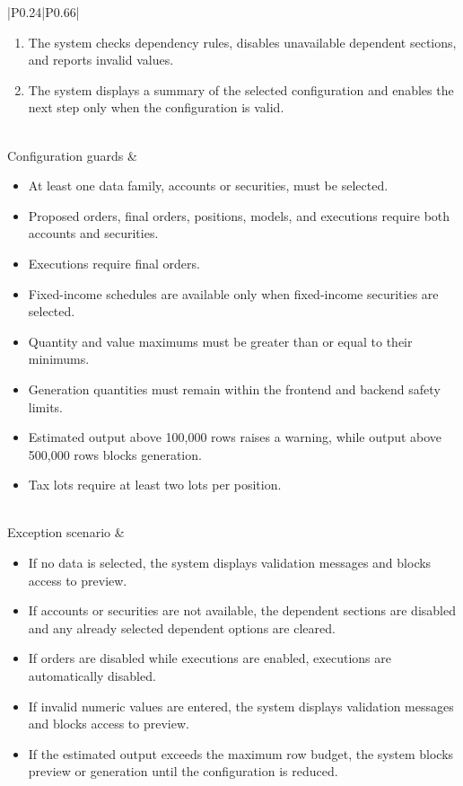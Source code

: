 \begin{longtable}{|P{0.24\linewidth}|P{0.66\linewidth}|}
\begin{enumerate}[leftmargin=*,nosep]
    \item The system checks dependency rules, disables unavailable dependent sections, and reports invalid values.
    \item The system displays a summary of the selected configuration and enables the next step only when the configuration is valid.
\end{enumerate} \\
\hline
Configuration guards &
\begin{itemize}[leftmargin=*,nosep]
    \item At least one data family, accounts or securities, must be selected.
    \item Proposed orders, final orders, positions, models, and executions require both accounts and securities.
    \item Executions require final orders.
    \item Fixed-income schedules are available only when fixed-income securities are selected.
    \item Quantity and value maximums must be greater than or equal to their minimums.
    \item Generation quantities must remain within the frontend and backend safety limits.
    \item Estimated output above 100,000 rows raises a warning, while output above 500,000 rows blocks generation.
    \item Tax lots require at least two lots per position.
\end{itemize} \\
\hline
Exception scenario &
\begin{itemize}[leftmargin=*,nosep]
    \item If no data is selected, the system displays validation messages and blocks access to preview.
    \item If accounts or securities are not available, the dependent sections are disabled and any already selected dependent options are cleared.
    \item If orders are disabled while executions are enabled, executions are automatically disabled.
    \item If invalid numeric values are entered, the system displays validation messages and blocks access to preview.
    \item If the estimated output exceeds the maximum row budget, the system blocks preview or generation until the configuration is reduced.
\end{itemize} \\
\hline
\end{longtable}
\renewcommand{\arraystretch}{1}

